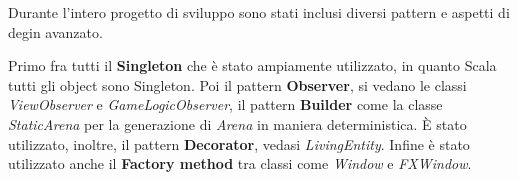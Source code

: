 Durante l'intero progetto di sviluppo sono stati inclusi diversi pattern e aspetti di degin avanzato.

Primo fra tutti il \textbf{Singleton} che è stato ampiamente utilizzato, in quanto Scala tutti gli object sono Singleton.
Poi il pattern \textbf{Observer}, si vedano le classi \textit{ViewObserver} e \textit{GameLogicObserver}, il pattern \textbf{Builder} come la classe \textit{StaticArena} per la generazione di \textit{Arena} in maniera deterministica.
\`E stato utilizzato, inoltre, il pattern \textbf{Decorator}, vedasi \textit{LivingEntity}.
Infine è stato utilizzato anche il \textbf{Factory method} tra classi come \textit{Window} e \textit{FXWindow}.